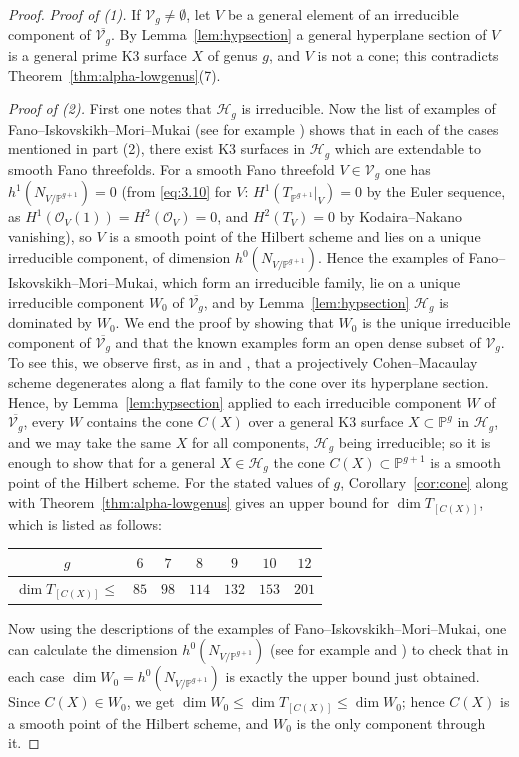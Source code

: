 \documentclass[11pt,reqno]{amsart}
\theoremstyle{plain}
\theoremstyle{definition}
\newcommand{\PP}{\mathbb{P}}
\newcommand{\OO}{\mathcal{O}}
\begin{document}
\begin{proof}
\emph{Proof of (1).} If $\mathcal V_g\neq\emptyset$, let $V$ be a general element of an irreducible component of $\overline{\mathcal V_g}$. By Lemma~\ref{lem:hypsection} a general hyperplane section of $V$ is a general prime K3 surface $X$ of genus $g$, and $V$ is not a cone; this contradicts Theorem~\ref{thm:alpha-lowgenus}(7).

\emph{Proof of (2).} First one notes that $\mathcal H_g$ is irreducible. Now the list of examples of Fano--Iskovskikh--Mori--Mukai (see for example \cite[Table~3.1]{CLM98}) shows that in each of the cases mentioned in part (2), there exist K3 surfaces in $\mathcal H_g$ which are extendable to smooth Fano threefolds. For a smooth Fano threefold $V\in\mathcal V_g$ one has $h^1(N_{V/\PP^{g+1}})=0$ (from \eqref{eq:3.10} for $V$: $H^1(T_{\PP^{g+1}}|_V)=0$ by the Euler sequence, as $H^1(\OO_V(1))=H^2(\OO_V)=0$, and $H^2(T_V)=0$ by Kodaira--Nakano vanishing), so $V$ is a smooth point of the Hilbert scheme and lies on a unique irreducible component, of dimension $h^0(N_{V/\PP^{g+1}})$. Hence the examples of Fano--Iskovskikh--Mori--Mukai, which form an irreducible family, lie on a unique irreducible component $W_0$ of $\overline{\mathcal V_g}$, and by Lemma~\ref{lem:hypsection} $\mathcal H_g$ is dominated by $W_0$. We end the proof by showing that $W_0$ is the unique irreducible component of $\overline{\mathcal V_g}$ and that the known examples form an open dense subset of $\mathcal V_g$. To see this, we observe first, as in \cite{CLM93} and \cite{CLM98}, that a projectively Cohen--Macaulay scheme degenerates along a flat family to the cone over its hyperplane section. Hence, by Lemma~\ref{lem:hypsection} applied to each irreducible component $W$ of $\overline{\mathcal V_g}$, every $W$ contains the cone $C(X)$ over a general K3 surface $X\subset\PP^g$ in $\mathcal H_g$, and we may take the same $X$ for all components, $\mathcal H_g$ being irreducible; so it is enough to show that for a general $X\in\mathcal H_g$ the cone $C(X)\subset\PP^{g+1}$ is a smooth point of the Hilbert scheme. For the stated values of $g$, Corollary~\ref{cor:cone} along with Theorem~\ref{thm:alpha-lowgenus} gives an upper bound for $\dim T_{[C(X)]}$, which is listed as follows:
\begin{center}
\begin{tabular}{c|cccccc}
$g$ & $6$ & $7$ & $8$ & $9$ & $10$ & $12$\\ \hline
$\dim T_{[C(X)]}\le$ & $85$ & $98$ & $114$ & $132$ & $153$ & $201$
\end{tabular}
\end{center}
Now using the descriptions of the examples of Fano--Iskovskikh--Mori--Mukai, one can calculate the dimension $h^0(N_{V/\PP^{g+1}})$ (see for example \cite[Table~2, p.~666]{CLM93} and \cite[Table~3.1]{CLM98}) to check that in each case $\dim W_0=h^0(N_{V/\PP^{g+1}})$ is exactly the upper bound just obtained. Since $C(X)\in W_0$, we get $\dim W_0\le\dim T_{[C(X)]}\le\dim W_0$; hence $C(X)$ is a smooth point of the Hilbert scheme, and $W_0$ is the only component through it.
\end{proof}
\end{document}
